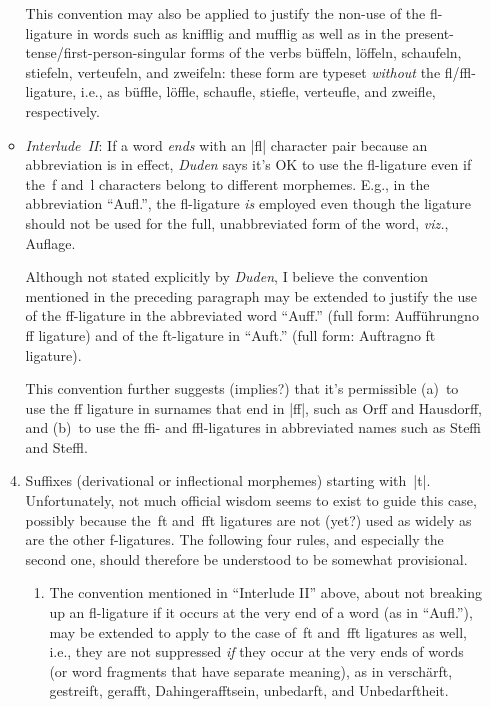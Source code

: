 \documentclass[11pt]{article}
\begin{document}
\begin{enumerate}
\begin{itemize}
This convention may also be applied to justify the non-use of the fl-ligature in words such as knifflig and mufflig as well as in the present-tense\slash first-person-singular forms of the verbs büffeln, löffeln, schaufeln, stiefeln, verteufeln, and zweifeln: these form are typeset \emph{without} the fl/ffl-ligature, i.e., as büffle, löffle, schaufle, stiefle, verteufle, and zweifle, respectively.

\item 
\emph{Interlude~II}: If a word \emph{ends} with an |fl| character pair because an abbreviation is in effect, \emph{Duden} says it's OK to use the fl-ligature even if the~f and~l characters belong to different morphemes. E.g., in the abbreviation \enquote{Aufl.}, the fl-ligature \emph{is} employed even though the ligature should not be used for the full, unabbreviated form of the word, \emph{viz.}, Auflage.

Although not stated explicitly by \emph{Duden}, I believe the convention mentioned in the preceding paragraph may be extended to justify the use of the ff-ligature in the abbreviated word \enquote{Auff.} (full form: Aufführung\textemdash no ff ligature) and of the ft-ligature in \enquote{Auft.} (full form: Auftrag\textemdash no ft ligature).

This convention further suggests (implies?) that it's permissible (a)~to use the ff ligature in surnames that end in |ff|, such as Orff and Hausdorff, and (b)~to use the ffi- and ffl-ligatures in abbreviated names such as Steffi and Steffl. 
\end{itemize}

\begin{enumerate}
\setcounter{enumii}{3}
\item Suffixes (derivational or inflectional morphemes) starting with~|t|. Unfortunately, not much official wisdom seems to exist to guide this case, possibly because the~ft and~fft ligatures are not (yet?) used as widely as are the other f-ligatures. The following four rules, and especially the second one, should therefore be understood to be somewhat provisional.

\begin{enumerate}
\item The convention mentioned in \enquote{Interlude II} above, about not breaking up an fl-ligature if it occurs at the very end of a word (as in ``Aufl.''), may be extended to apply to the case of~ft and~fft ligatures as well, i.e., they are not suppressed \emph{if} they occur at the very ends of words (or word fragments that have separate meaning), as in verschärft, gestreift, gerafft, Dahingerafftsein, unbedarft, and Unbedarftheit. 


\end{enumerate}
\end{enumerate}
\end{enumerate}
\end{document}
